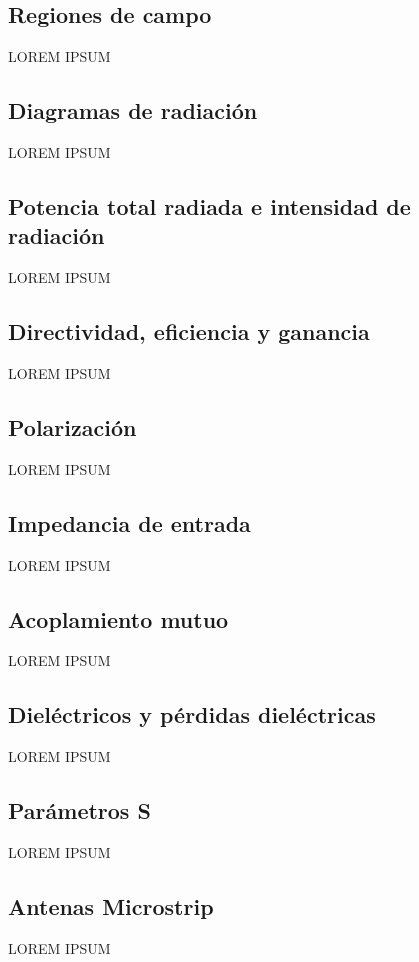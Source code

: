 \subsection{Regiones de campo}
\label{subsubsec_regiones_de_campo}
LOREM IPSUM
\subsection{Diagramas de radiación}
\label{subsubsec_diag_de_rad}
LOREM IPSUM
\subsection{Potencia total radiada e intensidad de radiación}
\label{subsubsec_pot_total_radiada}
LOREM IPSUM
\subsection{Directividad, eficiencia y ganancia}
\label{subsubsec_directividad}
LOREM IPSUM
\subsection{Polarización}
\label{subsubsec_polarizacion}
LOREM IPSUM

\subsection{Impedancia de entrada}
\label{subsec_imp_entrada}
LOREM IPSUM
\subsection{Acoplamiento mutuo}
\label{subsec_acoplamiento}
LOREM IPSUM
\subsection{Dieléctricos y pérdidas dieléctricas}
\label{subsec_dielectricos}
LOREM IPSUM
\subsection{Parámetros S}
\label{subsec_parametros_s}
LOREM IPSUM

\subsection{Antenas Microstrip}
\label{subsec_antenas_microstrip}
LOREM IPSUM
